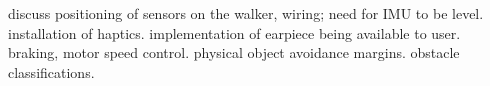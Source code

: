 

\noindent discuss positioning of sensors on the walker, wiring; need for IMU to be level. installation of haptics. implementation of earpiece being available to user. braking, motor speed control. physical object avoidance margins. obstacle classifications.